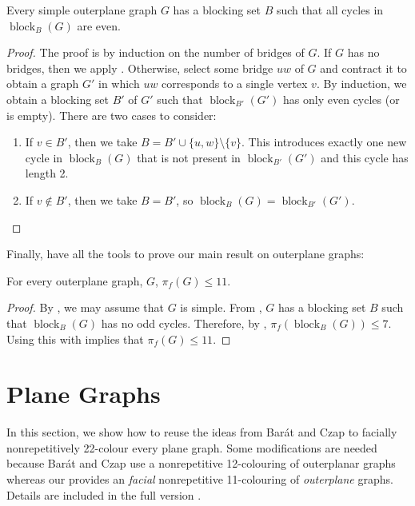 \documentclass{cccg16}
\DeclareMathOperator{\block}{block}
\begin{document}
\begin{lem}
  Every simple outerplane graph $G$ has a blocking set $B$ such that
  all cycles in $\block_B(G)$ are even.
\end{lem}

\begin{proof}
  The proof is by induction on the number of bridges of $G$.  If $G$
  has no bridges, then we apply .  Otherwise,
  select some bridge $uw$ of $G$ and contract it to obtain a graph $G'$
  in which $uw$ corresponds to a single vertex $v$.  By induction,
  we obtain a blocking set $B'$ of $G'$ such that $\block_{B'}(G')$
  has only even cycles (or is empty).  There are two cases to consider:
  \begin{enumerate}
    \item If $v\in B'$, then we take $B=B'\cup\{u,w\}\setminus\{v\}$. This introduces exactly one new cycle in $\block_B(G)$ that is not present in $\block_{B'}(G')$ and this cycle has length 2.

    \item If $v\not\in B'$, then we take $B=B'$, so
    $\block_B(G)=\block_{B'}(G')$. \qedhere
  \end{enumerate}
\end{proof}

Finally, have all the tools to prove our main result on outerplane graphs:

\begin{thm}
  For every outerplane graph, $G$, $\pi_f(G)\le 11$.
\end{thm}

\begin{proof}
By , we may assume that $G$ is simple.  From
, $G$ has a blocking set $B$ such that $\block_B(G)$
has no odd cycles.  Therefore, by , $\pi_f(\block_B(G))\le
7$.  Using this with  implies that $\pi_f(G)\le 11$.
\end{proof}


\section{Plane Graphs}

In this section, we show how to reuse the ideas from Bar\'at and Czap
\cite{barat2013facial} to facially nonrepetitively 22-colour every
plane graph.  Some modifications are needed because Bar\'at and Czap
use a nonrepetitive 12-colouring of outerplanar graphs whereas our
 provides an \emph{facial} nonrepetitive 11-colouring
of \emph{outerplane} graphs.  Details are included in the full version
\cite{bose.dujmovic.ea:new}.
\end{document}

